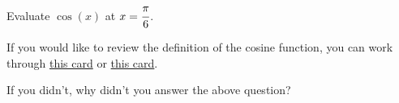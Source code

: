 \documentclass{ximera}
\begin{document}
\begin{problem} 

\begin{problem}
    Evaluate $\cos(x)$ at $x = \cfrac{\pi}{6}$.
    
    \begin{hint}
    If you would like to review the definition of the cosine function, you can work through \href{https://ximera.osu.edu/math160fa17/m160prerequisites/prerequisiteVideos/trigUnitCircle}{this card} or \href{https://ximera.osu.edu/math160fa17/m160prerequisites/reviewOfFamousFunctions/digInTrigonometricFunctions}{this card}.
    \end{hint}

  \begin{multipleChoice}
      \choice{$\pi$}
      \choice{$2\pi$}
      
      
  \end{multipleChoice}
  
\end{problem}

\begin{question}
  
    If you didn't, why didn't you answer the above question?
  
  \begin{multipleChoice}
      

  \end{multipleChoice}
  
\end{question}

\end{problem}
\end{document}
